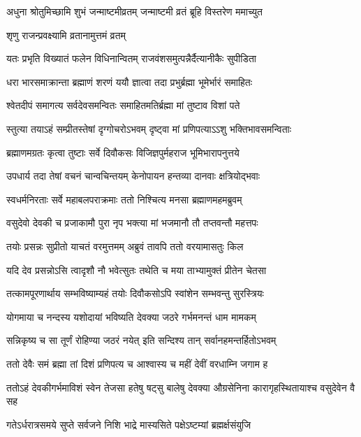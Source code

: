 \twolineshloka
{अधुना श्रोतुमिच्छामि शुभं जन्माष्टमीव्रतम्}
{जन्माष्टमी व्रतं ब्रूहि विस्तरेण ममाच्युत}%

\onelineshloka
{शृणु राजन्प्रवक्ष्यामि व्रतानामुत्तमं व्रतम्}%

\twolineshloka
{यतः प्रभृति विख्यातं फलेन विधिनान्वितम्}
{राजवंशसमुत्पन्नैर्दैत्यानीकैः सुपीडिता}%

\twolineshloka
{धरा भारसमाक्रान्ता ब्रह्माणं शरणं ययौ}
{ज्ञात्वा तदा प्रभुर्ब्रह्मा भूमेर्भारं समाहितः}%

\twolineshloka
{श्वेतदीपं समागत्य सर्वदेवसमन्वितः}
{समाहितमतिर्ब्रह्मा मां तुष्टाव विशां पते}%

\twolineshloka
{स्तुत्या तयाऽहं सम्प्रीतस्तेषां दृग्गोचरोऽभवम्}
{दृष्ट्वा मां प्रणिपत्याऽऽशु भक्तिभावसमन्विताः}%

\twolineshloka
{ब्रह्माणमग्रतः कृत्वा तुष्टाः सर्वे दिवौकसः}
{विजिज्ञपुर्महराज भूमिभारापनुत्तये}%

\twolineshloka
{उपधार्य तदा तेषां वचनं चान्वचिन्तयम्}
{केनोपायन हन्तव्या दानवाः क्षत्रियोद्भवाः}%

\twolineshloka
{स्वधर्मनिरताः सर्वे महाबलपराक्रमाः}
{ततो निश्चित्य मनसा ब्रह्माणमहमब्रुवम्}%

\twolineshloka
{वसुदेवो देवकी च प्रजाकामौ पुरा नृप}
{भक्त्या मां भजमानौ तौ तप्तवन्तौ महत्तपः}%

\twolineshloka
{तयोः प्रसन्नः सुप्रीतो याचतं वरमुत्तमम्}
{अब्रुवं तावपि ततो वरयामासतुः किल}%

\twolineshloka
{यदि देव प्रसन्नोऽसि त्वादृशौ नौ भवेत्सुतः}
{तथेति च मया ताभ्यामुक्तं प्रीतेन चेतसा}%

\twolineshloka
{तत्कामपूरणार्थाय सम्भविष्याम्यहं तयोः}
{दिवौकसोऽपि स्वांशेन सम्भवन्तु सुरस्त्रियः}%

\twolineshloka
{योगमाया च नन्दस्य यशोदायां भविष्यति}
{देवक्या जठरे गर्भमनन्तं धाम मामकम्}%

\twolineshloka
{सन्निकृष्य च सा तूर्णं रोहिण्या जठरं नयेत्}
{इति सन्दिश्य तान् सर्वानहमन्तर्हितोऽभवम्}%

\twolineshloka
{ततो देवैः समं ब्रह्मा तां दिशं प्रणिपत्य च}
{आश्वास्य च महीं देवीं वरधाम्नि जगाम ह}%

\threelineshloka
{ततोऽहं देवकीगर्भमाविशं स्वेन तेजसा}
{हतेषु षट्सु बालेषु देवक्या औग्रसेनिना}
{कारागृहस्थितायाश्च वसुदेवेन वै सह}%

\twolineshloka
{गतेऽर्धरात्रसमये सुप्ते सर्वजने निशि}
{भाद्रे मास्यसिते पक्षेऽष्टम्यां ब्रह्मर्क्षसंयुजि}%

